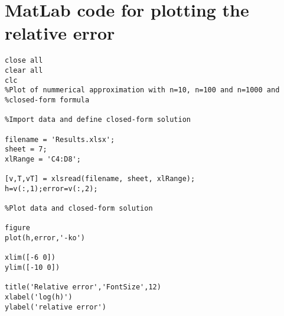 \chapter{MatLab code for plotting the relative error}
\label{app:MatLabError}
\vspace{1.5cm}
\lstset{language=Matlab}
\begin{lstlisting}
close all
clear all
clc
%Plot of nummerical approximation with n=10, n=100 and n=1000 and
%closed-form formula

%Import data and define closed-form solution

filename = 'Results.xlsx';
sheet = 7;
xlRange = 'C4:D8';

[v,T,vT] = xlsread(filename, sheet, xlRange);
h=v(:,1);error=v(:,2);

%Plot data and closed-form solution

figure
plot(h,error,'-ko')

xlim([-6 0])
ylim([-10 0])

title('Relative error','FontSize',12)
xlabel('log(h)')
ylabel('relative error')
\end{lstlisting}